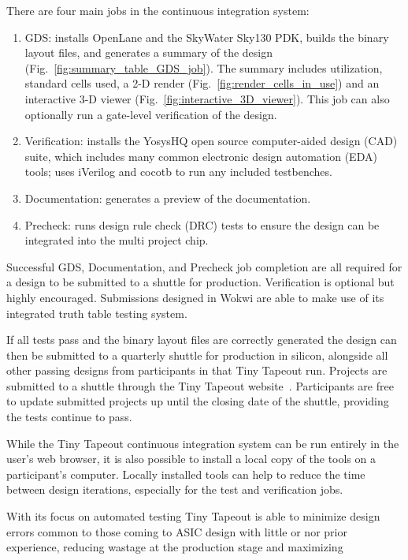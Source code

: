 There are four main jobs in the continuous integration system:

\begin{enumerate}
	\item GDS: installs OpenLane\cite{openlane} and the SkyWater Sky130\cite{skywaterpdk} PDK, builds the binary layout files, and generates a summary of the design (Fig.~\ref{fig:summary_table_GDS_job}). The summary includes utilization, standard cells used, a 2-D render (Fig.~\ref{fig:render_cells_in_use}) and an interactive 3-D viewer (Fig.~\ref{fig:interactive_3D_viewer}).
This job can also optionally run a gate-level verification of the design.
	\item Verification: installs the YosysHQ open source computer-aided design (CAD) suite, which includes many common electronic design automation (EDA) tools; uses iVerilog\cite{iverilog} and cocotb\cite{cocotb} to run any included testbenches.
	\item Documentation: generates a preview of the documentation.
	\item Precheck: runs design rule check (DRC) tests to ensure the design can be integrated into the multi project chip.
\end{enumerate}

Successful GDS, Documentation, and Precheck job completion are all required for a design to be submitted to a shuttle for production.
Verification is optional but highly encouraged. Submissions designed in Wokwi are able to make use of its integrated truth table testing system\cite{automatedtesting}.

If all tests pass and the binary layout files are correctly generated the design can then be submitted to a quarterly shuttle for production in silicon, alongside all other passing designs from participants in that Tiny Tapeout run. Projects are submitted to a shuttle through the Tiny Tapeout website~\cite{tinytapeout}. Participants are free to update submitted projects up until the closing date of the shuttle, providing the tests continue to pass.

While the Tiny Tapeout continuous integration system can be run entirely in the user's web browser, it is also possible to install a local copy of the tools\cite{localinstall} on a participant's computer. Locally installed tools can help to reduce the time between design iterations, especially for the test and verification jobs.

With its focus on automated testing Tiny Tapeout is able to minimize design errors common to those coming to ASIC design with little or nor prior experience, reducing wastage at the production stage and maximizing


